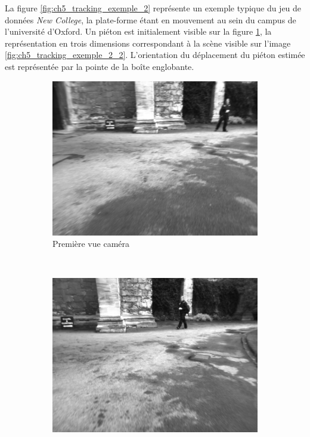 La figure \ref{fig:ch5_tracking_exemple_2} représente un exemple typique du jeu de données \textit{New College}, la plate-forme étant en mouvement au sein du campus de l'université d'Oxford. Un piéton est initialement visible sur la figure \ref{fig:ch5_tracking_exemple_2_1}, la représentation en trois dimensions correspondant à la scène visible sur l'image \ref{fig:ch5_tracking_exemple_2_2}. L'orientation du déplacement du piéton estimée est représentée par la pointe de la boîte englobante.

\begin{figure}
	\begin{center}
		\begin{subfigure}[t]{0.40\textwidth}
			\includegraphics[width=\textwidth]{Chapter5/graphics/NewCollege_pict_1_1.png} 
			\caption{Première vue caméra}
			\label{fig:ch5_tracking_exemple_2_1}
		\end{subfigure}	
		~
		\begin{subfigure}[t]{0.40\textwidth}
			\includegraphics[width=\textwidth]{Chapter5/graphics/NewCollege_pict_1_2.png} 

\end{subfigure}
\end{center}
\end{figure}
